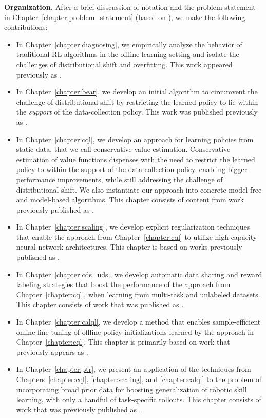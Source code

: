 \documentclass[../thesis.tex]{subfiles}
\begin{document}
\textbf{Organization.} After a brief disscussion of notation and the problem statement in Chapter~\ref{chapter:problem_statement} (based on \citet{levine2020offline}), we make the following contributions:  
\begin{itemize}
    \item In Chapter~\ref{chapter:diagnosing}, we empirically analyze the behavior of traditional RL algorithms in the offline learning setting and isolate the challenges of distributional shift and overfitting. This work appeared previously as \citet{fu2019diagnosing}.
    \item In Chapter~\ref{chapter:bear}, we develop an initial algorithm to circumvent the challenge of distributional shift by restricting the learned policy to lie within the \emph{support} of the data-collection policy. This work was published previously as \citet{kumar2019stabilizing}.    
    \item In Chapter~\ref{chapter:cql}, we develop an approach for learning policies from static data, that we call conservative value estimation. Conservative estimation of value functions dispenses with the need to restrict the learned policy to within the support of the data-collection policy, enabling bigger performance improvements, while still addressing the challenge of distributional shift. We also instantiate our approach into concrete model-free and model-based algorithms. This chapter consists of content from work previously published as \citet{kumar2020conservative,yu2021combo}.
    \item In Chapter~\ref{chapter:scaling}, we develop explicit regularization techniques that enable the approach from Chapter~\ref{chapter:cql} to utilize high-capacity neural network architectures. This chapter is based on works previously published as \citet{kumar2021dr3,kumar2023offline}.
    \item In Chapter~\ref{chapter:cds_uds}, we develop automatic data sharing and reward labeling strategies that boost the performance of the approach from Chapter~\ref{chapter:cql}, when learning from multi-task and unlabeled datasets. This chapter consists of work that was published as \citet{yu2021conservative,yu2022leverage}.
    \item In Chapter~\ref{chapter:calql}, we develop a method that enables sample-efficient online fine-tuning of offline policy initializations learned by the approach in Chapter~\ref{chapter:cql}. This chapter is primarily based on work that previously appears as \citet{nakamoto2023calql}.
    \item In Chapter~\ref{chapter:ptr}, we present an application of the techniques from Chapters~\ref{chapter:cql}, \ref{chapter:scaling}, and \ref{chapter:calql} to the problem of incorporating broad prior data for boosting generalization of robotic skill learning, with only a handful of task-specific rollouts. This chapter consists of work that was previously published as \citet{kumar2022pre}.

\end{itemize}
\end{document}
